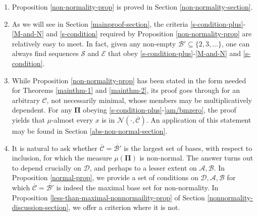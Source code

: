 \documentclass[12pt, twoside]{article}
\theoremstyle{definition}
\numberwithin{equation}{section}
\begin{document}
\begin{enumerate}[1.]
\item Proposition \ref{non-normality-prop} is proved in Section \ref{non-normality-section}.  
\item As we will see in Section \ref{mainproof-section}, the criteria \eqref{s-condition-plus}-\eqref{M-and-N} and \eqref{s-condition} required by Proposition \ref{non-normality-prop} are relatively easy to meet. In fact, given any non-empty $\mathscr{B}' \subseteq \{2, 3, \ldots\}$, one can always find sequences $\mathcal S$ and $\mathcal E$ that obey \eqref{s-condition-plus}-\eqref{M-and-N} and \eqref{s-condition}.   
\item \label{non-normality-prop-variant} While Proposition \ref{non-normality-prop} has been stated in the form needed for Theorems \ref{mainthm-1} and \ref{mainthm-2}, its proof goes through for an arbitrary $\mathscr{C}$, not necessarily minimal, whose members may be multiplicatively dependent. For any $\pmb{\Pi}$ obeying \eqref{s-condition-plus}-\eqref{am/bmzero}, the proof yields that $\mu$-almost every $x$ is in $\mathscr{N}(\cdot, \overline{\mathscr{C}})$. An application of this statement may be found in Section \ref{abs-non-normal-section}.
\item It is natural to ask whether $\overline{\mathscr{C}} = \overline{\mathscr{B}'}$ is the largest set of bases, with respect to inclusion, for which the measure $\mu(\pmb{\Pi})$ is non-normal. The answer turns out to depend crucially on $\mathcal D$, and perhaps to a lesser extent on $\mathcal A, \mathcal B$. In Proposition \ref{normal-prop}, we provide a set of conditions on $\mathcal D, \mathcal A, \mathcal B$ for which $\overline{\mathscr{C}} = \overline{\mathscr{B}'}$ is indeed the maximal base set for non-normality. In Proposition \ref{less-than-maximal-nonnormaility-prop} of Section \ref{nonnormality-discussion-section}, we offer a criterion where it is not.   
\end{enumerate} 
\end{document}
